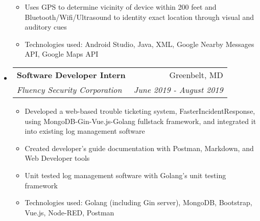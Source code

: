\documentclass[letterpaper,10pt]{article}
\makeatletter
\newcommand{\resitem}[1]{\item #1 \vspace{-2pt}}
\newcommand{\ressubheading}[4]{
\begin{tabular*}{7.0in}{l@{\extracolsep{\fill}}r}
		\textbf{#1} & #2 \\
		\textit{#3} & \textit{#4} \\
\end{tabular*}\vspace{-6pt}}
\makeatother
\begin{document}
\begin{itemize}
\begin{itemize}
        \resitem{Uses GPS to determine vicinity of device within 200 feet and Bluetooth/Wifi/Ultrasound to identity exact location through visual and auditory cues}
        \resitem{Technologies used: Android Studio, Java, XML, Google Nearby Messages API, Google Maps API}
    \end{itemize}
\item
    \ressubheading{Software Developer Intern}{Greenbelt, MD}{Fluency Security Corporation}{June 2019 - August 2019}
	\begin{itemize}
	    \resitem{Developed a web-based trouble ticketing system, FasterIncidentResponse, using MongoDB-Gin-Vue.js-Golang fullstack framework, and integrated it into existing log management software}
		\resitem{Created developer's guide documentation with Postman, Markdown, and Web Developer tools}
		\resitem{Unit tested log management software with Golang's unit testing framework}
		\resitem{Technologies used: Golang (including Gin server), MongoDB, Bootstrap, Vue.js, Node-RED, Postman}
	\end{itemize}
\end{itemize}

\pagebreak
\end{document}
